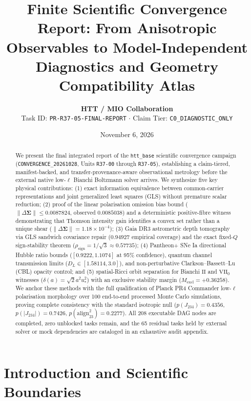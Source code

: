 \documentclass[11pt,a4paper]{article}
\title{\textbf{Finite Scientific Convergence Report: From Anisotropic Observables to Model-Independent Diagnostics and Geometry Compatibility Atlas}}
\author{\textbf{HTT / MIO Collaboration} \\ \small Task ID: \texttt{PR-R37-05-FINAL-REPORT} $\cdot$ Claim Tier: \texttt{C0\_DIAGNOSTIC\_ONLY}}
\date{November 6, 2026}
\begin{document}
\maketitle

\begin{abstract}
We present the final integrated report of the \texttt{htt\_base} scientific convergence campaign (\texttt{CONVERGENCE\_20261028}, Units \texttt{R37-00} through \texttt{R37-05}), establishing a claim-tiered, manifest-backed, and transfer-provenance-aware observational metrology before the external native low-$\ell$ Bianchi Boltzmann solver arrives. We synthesize five key physical contributions: (1) exact information equivalence between common-carrier representations and joint generalized least squares (GLS) without premature scalar reduction; (2) proof of the linear polarisation omission bias bound ($\|\Delta\boldsymbol{\Sigma}\| \le 0.0087824$, observed $0.0085038$) and a deterministic positive-fibre witness demonstrating that Thomson intensity gain identifies a convex set rather than a unique shear ($\|\Delta\boldsymbol{\Sigma}\| = 1.18 \times 10^{-4}$); (3) Gaia DR3 astrometric depth tomography via GLS sandwich covariance repair ($0.94927$ empirical coverage) and the exact fixed-$Q$ sign-stability theorem ($\rho_{\mathrm{sign}} = 1/\sqrt{3} \approx 0.57735$); (4) Pantheon+ SNe Ia directional Hubble ratio bounds ($[0.9222, 1.1074]$ at 95\% confidence), quantum channel transmission limits ($D_L \in [1.58114, 3.0]$), and non-perturbative Clarkson--Bassett--Lu (CBL) opacity control; and (5) spatial-Ricci orbit separation for Bianchi $\mathrm{II}$ and $\mathrm{VII}_0$ witnesses ($\delta(a) = \sqrt{2}a^2 u_*^2$) with an exclusive stability margin ($M_{\mathrm{excl}} = +0.36258$). We anchor these methods with the full qualification of Planck PR4 Commander low-$\ell$ polarisation morphology over 100 end-to-end processed Monte Carlo simulations, proving complete consistency with the standard isotropic null ($p(J_{234}) = 0.4356$, $p(|J_{234}|) = 0.7426$, $p(\mathrm{align}_{23}^2) = 0.2277$). All 208 executable DAG nodes are completed, zero unblocked tasks remain, and the 65 residual tasks held by external solver or mock dependencies are cataloged in an exhaustive audit appendix.
\end{abstract}

\section{Introduction and Scientific Boundaries}
\end{document}
